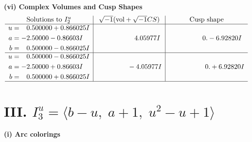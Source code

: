 \documentclass[1p]{elsarticle_modified}
\theoremstyle{definition}
\newcommand{\I}{\sqrt{-1}}
\begin{document}
\newpage\flushleft \textbf{(vi) Complex Volumes and Cusp Shapes}
$$\begin{array}{c|c|c}  
\text{Solutions to }I^u_{2}& \I (\text{vol} + \sqrt{-1}CS) & \text{Cusp shape}\\
 \hline 
\begin{aligned}
u &= \phantom{-}0.500000 + 0.866025 I \\
a &= -2.50000 - 0.86603 I \\
b &= \phantom{-}0.500000 - 0.866025 I\end{aligned}
 & \phantom{-0.000000 -}4.05977 I & \phantom{-0.000000 } 0. - 6.92820 I \\ \hline\begin{aligned}
u &= \phantom{-}0.500000 - 0.866025 I \\
a &= -2.50000 + 0.86603 I \\
b &= \phantom{-}0.500000 + 0.866025 I\end{aligned}
 & \phantom{-0.000000 } -4.05977 I & \phantom{-0.000000 -}0. + 6.92820 I\\
 \hline 
 \end{array}$$\newpage\newpage\renewcommand{\arraystretch}{1}
\centering \section*{III. $I^u_{3}= \langle b- u,\;a+1,\;u^2- u+1 \rangle$}
\flushleft \textbf{(i) Arc colorings}\\
\end{document}
